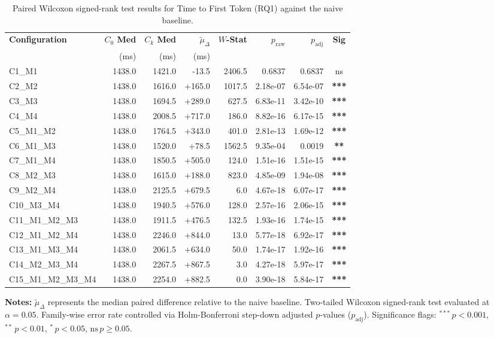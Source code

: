 \begin{table}[!htbp]
\centering
\small
\caption{Paired Wilcoxon signed-rank test results for Time to First Token (RQ1) against the naive baseline.}
\label{tab:wilcoxon_rq1_ttft}
\begin{tabular*}{\textwidth}{@{\extracolsep{\fill}} l r r r r r r c @{}}
\toprule
\textbf{Configuration} & \textbf{$C_0$ Med} & \textbf{$C_k$ Med} & \textbf{$\tilde{\mu}_\Delta$} & \textbf{$W$-Stat} & \textbf{$p_{\text{raw}}$} & \textbf{$p_{\text{adj}}$} & \textbf{Sig} \\
 & \scriptsize{(ms)} & \scriptsize{(ms)} & \scriptsize{(ms)} & & & & \\
\midrule
C1\_M1 & 1438.0 & 1421.0 & -13.5 & 2406.5 & 0.6837 & 0.6837 & ns \\
C2\_M2 & 1438.0 & 1616.0 & +165.0 & 1017.5 & 2.18e-07 & 6.54e-07 & \textbf{***} \\
C3\_M3 & 1438.0 & 1694.5 & +289.0 & 627.5 & 6.83e-11 & 3.42e-10 & \textbf{***} \\
C4\_M4 & 1438.0 & 2008.5 & +717.0 & 186.0 & 8.82e-16 & 6.17e-15 & \textbf{***} \\
C5\_M1\_M2 & 1438.0 & 1764.5 & +343.0 & 401.0 & 2.81e-13 & 1.69e-12 & \textbf{***} \\
C6\_M1\_M3 & 1438.0 & 1520.0 & +78.5 & 1562.5 & 9.35e-04 & 0.0019 & \textbf{**} \\
C7\_M1\_M4 & 1438.0 & 1850.5 & +505.0 & 124.0 & 1.51e-16 & 1.51e-15 & \textbf{***} \\
C8\_M2\_M3 & 1438.0 & 1615.0 & +188.0 & 823.0 & 4.85e-09 & 1.94e-08 & \textbf{***} \\
C9\_M2\_M4 & 1438.0 & 2125.5 & +679.5 & 6.0 & 4.67e-18 & 6.07e-17 & \textbf{***} \\
C10\_M3\_M4 & 1438.0 & 1940.5 & +576.0 & 128.0 & 2.57e-16 & 2.06e-15 & \textbf{***} \\
C11\_M1\_M2\_M3 & 1438.0 & 1911.5 & +476.5 & 132.5 & 1.93e-16 & 1.74e-15 & \textbf{***} \\
C12\_M1\_M2\_M4 & 1438.0 & 2246.0 & +844.0 & 13.0 & 5.77e-18 & 6.92e-17 & \textbf{***} \\
C13\_M1\_M3\_M4 & 1438.0 & 2061.5 & +634.0 & 50.0 & 1.74e-17 & 1.92e-16 & \textbf{***} \\
C14\_M2\_M3\_M4 & 1438.0 & 2267.5 & +867.5 & 3.0 & 4.27e-18 & 5.97e-17 & \textbf{***} \\
C15\_M1\_M2\_M3\_M4 & 1438.0 & 2254.0 & +882.5 & 0.0 & 3.90e-18 & 5.84e-17 & \textbf{***} \\
\bottomrule
\end{tabular*}
\vspace{0.5em}
\parbox{\textwidth}{\footnotesize
\textbf{Notes:} $\tilde{\mu}_\Delta$ represents the median paired difference relative to the naive baseline. Two-tailed Wilcoxon signed-rank test evaluated at $\alpha = 0.05$. Family-wise error rate controlled via Holm-Bonferroni step-down adjusted $p$-values ($p_{\text{adj}}$). Significance flags: $^{***}\,p < 0.001$, $^{**}\,p < 0.01$, $^{*}\,p < 0.05$, $\text{ns}\,p \ge 0.05$.}
\end{table}
